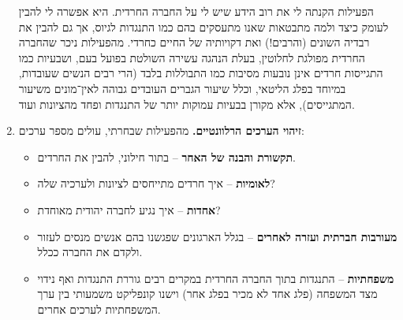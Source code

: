 \documentclass[]{article}
\begin{document}
\begin{enumerate}
        הפעילות הקנתה לי את רוב הידע שיש לי על החברה החרדית. היא אפשרה לי להבין לעומק כיצד ולמה מתבטאות שאנו מתעסקים בהם כמו התנגדות לגיוס, אך גם להבין את רבדיה השונים (והרבים!) ואת דקויותיה של החיים כחרדי. מהפעילות ניכר שהחברה החרדית מפולגת לחלוטין, בעלת הנהגה עשירה השולטת בפועל בעם, ושבעיות כמו התגייסות חרדים אינן נובעות מסיבות כמו התבוללות בלבד (הרי רבים הנשים שעובדות, במיוחד בפלג הליטאי, וכלל שיעור הגברים העובדים גבוהה לאין־מונים משיעור המתגייסים), אלא מקורן בבעיות עמוקות יותר של התנגדות ופחד מהציונות ועוד. 
        \item \textbf{זיהוי הערכים הרלוונטיים. }מהפעילות שבחרתי, עולים מספר ערכים: 
        \begin{itemize}
            \item \textbf{תקשורת והבנה של האחר} – בתור חילוני, להבין את החרדים. 
            \item \textbf{לאומיות} – איך חרדים מתייחסים לציונות ולערכיה שלה? 
            \item \textbf{אחדות} – איך נגיע לחברה יהודית מאוחדת? 
            \item \textbf{מעורבות חברתית ועזרה לאחרים} – בגלל הארגונים שפגשנו בהם אנשים מנסים לעזור ולקדם את החברה ככלל. 
            \item \textbf{משפחתיות} – התנגדות בתוך החברה החרדית במקרים רבים גוררת התנגדות ואף נידוי מצד המשפחה (פלג אחד לא מכיר בפלג אחר) וישנו קונפליקט משמעותי בין ערך המשפחתיות לערכים אחרים. 
        \end{itemize}
        

\end{enumerate}
\end{document}
